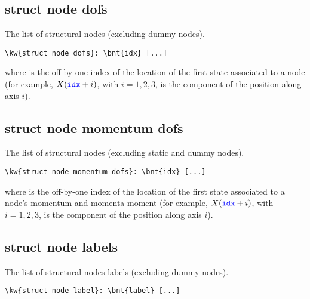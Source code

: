 \subsection{struct node dofs}
The list of structural nodes (excluding dummy nodes).
\begin{Verbatim}[commandchars=\\\{\}]
\kw{struct node dofs}: \bnt{idx} [...]
\end{Verbatim}
where  is the off-by-one index of the location of the first
state associated to a node (for example, $X(\textcolor{blue}{\texttt{idx}} + i)$, with $i = 1,2,3$,
is the component of the position along axis $i$).

\subsection{struct node momentum dofs}
The list of structural nodes (excluding static and dummy nodes).
\begin{Verbatim}[commandchars=\\\{\}]
\kw{struct node momentum dofs}: \bnt{idx} [...]
\end{Verbatim}
where  is the off-by-one index of the location of the first
state associated to a node's momentum and momenta moment
(for example, $X(\textcolor{blue}{\texttt{idx}} + i)$, with $i = 1,2,3$,
is the component of the position along axis $i$).

\subsection{struct node labels}
The list of structural nodes labels (excluding dummy nodes).
\begin{Verbatim}[commandchars=\\\{\}]
\kw{struct node label}: \bnt{label} [...]
\end{Verbatim}

